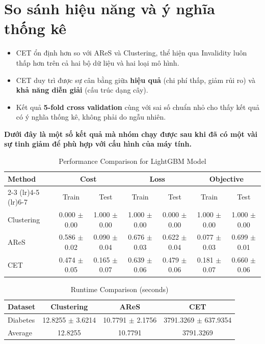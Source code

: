 \section{So sánh hiệu năng và ý nghĩa thống kê}
\begin{itemize}
    \item CET ổn định hơn so với AReS và Clustering, thể hiện qua Invalidity luôn thấp hơn trên cả hai bộ dữ liệu và hai loại mô hình.
    \item CET duy trì được sự cân bằng giữa \textbf{hiệu quả} (chi phí thấp, giảm rủi ro) và \textbf{khả năng diễn giải} (cấu trúc dạng cây).
    \item Kết quả \textbf{5-fold cross validation} cùng với sai số chuẩn nhỏ cho thấy kết quả có ý nghĩa thống kê, không phải do ngẫu nhiên.
\end{itemize}



\textbf{Dưới đây là một số kết quả mà nhóm chạy được sau khi đã có một vài sự tinh giảm để phù hợp với cấu hình của máy tính.}

\begin{table}[htbp]
\centering
\caption{Performance Comparison for LightGBM Model}
\label{tab:compare_x}
\begin{tabular}{lcccccc}
\toprule
Method & \multicolumn{2}{c}{Cost} & \multicolumn{2}{c}{Loss} & \multicolumn{2}{c}{Objective} \\
\cmidrule(lr){2-3} \cmidrule(lr){4-5} \cmidrule(lr){6-7}
 & Train & Test & Train & Test & Train & Test \\
\midrule
Clustering & 0.000 $\pm$ 0.00 & 1.000 $\pm$ 0.00 & 1.000 $\pm$ 0.00 & 0.000 $\pm$ 0.00 & 1.000 $\pm$ 0.00 & 1.000 $\pm$ 0.00 \\
AReS & 0.586 $\pm$ 0.02 & 0.090 $\pm$ 0.04 & 0.676 $\pm$ 0.03 & 0.622 $\pm$ 0.04 & 0.077 $\pm$ 0.03 & 0.699 $\pm$ 0.01 \\
CET & 0.474 $\pm$ 0.05 & 0.165 $\pm$ 0.07 & 0.639 $\pm$ 0.06 & 0.479 $\pm$ 0.06 & 0.181 $\pm$ 0.07 & 0.660 $\pm$ 0.06 \\
\bottomrule
\end{tabular}
\end{table}

\begin{table}[htbp]
\centering
\caption{Runtime Comparison (seconds)}
\label{tab:runtime_comparison}
\begin{tabular}{lccc}
\toprule
Dataset & Clustering & AReS & CET \\
\midrule
Diabetes & 12.8255 $\pm$ 3.6214 & 10.7791 $\pm$ 2.1756 & 3791.3269 $\pm$ 637.9354 \\
\midrule
Average & 12.8255 & 10.7791 & 3791.3269 \\
\bottomrule
\end{tabular}
\end{table}

